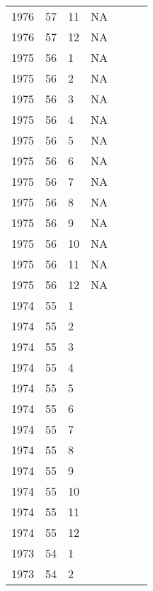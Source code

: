 \begin{longtable}{ |l|l|l|l|p{2.7cm}|l|p{2cm}| }
 1976 & 57 &    11 &     NA  &                &  & \\
 1976 & 57 &    12 &     NA  &                &   & \\
 1975 & 56 &     1 &     NA  &                &  & \\
 1975 & 56 &     2 &     NA  &                &  & \\
 1975 & 56 &     3 &     NA  &                &  & \\
 1975 & 56 &     4 &     NA  &                &  & \\
 1975 & 56 &     5 &     NA  &                &  & \\
 1975 & 56 &     6 &     NA  &                &  & \\
 1975 & 56 &     7 &     NA  &                &  & \\
 1975 & 56 &     8 &     NA  &                &  & \\
 1975 & 56 &     9 &     NA  &                &  & \\
 1975 & 56 &    10 &     NA  &                &  & \\
 1975 & 56 &    11 &     NA  &                &  & \\
 1975 & 56 &    12 &     NA  &                &  & \\
 1974 & 55 &     1 &         &                &  & \\
 1974 & 55 &     2 &         &                &  & \\
 1974 & 55 &     3 &         &                &  & \\
 1974 & 55 &     4 &         &                &  & \\
 1974 & 55 &     5 &         &                &  & \\
 1974 & 55 &     6 &         &                &  & \\
 1974 & 55 &     7 &         &                &  & \\
 1974 & 55 &     8 &         &                &  & \\
 1974 & 55 &     9 &         &                &  & \\
 1974 & 55 &    10 &         &                &  & \\
 1974 & 55 &    11 &         &                &  & \\
 1974 & 55 &    12 &         &                &  & \\
 1973 & 54 &     1 &         &                &  & \\
 1973 & 54 &     2 &         &                &  & \\

\end{longtable}
